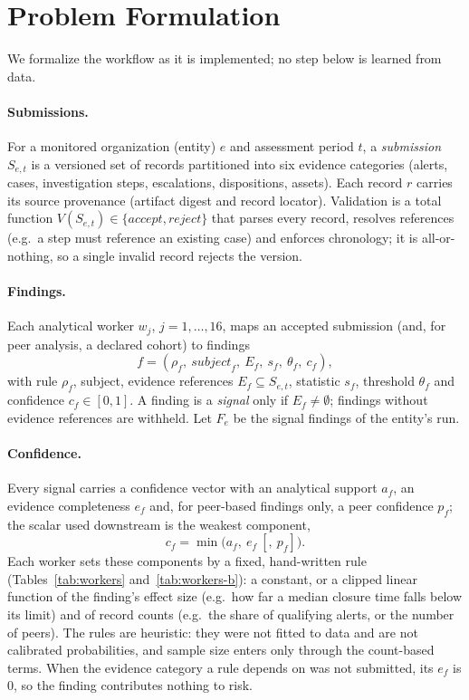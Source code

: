 \section{Problem Formulation}
\label{sec:formulation}

We formalize the workflow as it is implemented; no step below is learned from data.

\paragraph{Submissions.} For a monitored organization (entity) $e$ and assessment
period $t$, a \emph{submission} $S_{e,t}$ is a versioned set of records partitioned
into six evidence categories (alerts, cases, investigation steps, escalations,
dispositions, assets). Each record $r$ carries its source provenance (artifact digest
and record locator). Validation is a total function
$V(S_{e,t})\in\{\mathit{accept},\mathit{reject}\}$ that parses every record, resolves
references (e.g.\ a step must reference an existing case) and enforces chronology; it
is all-or-nothing, so a single invalid record rejects the version.

\paragraph{Findings.} Each analytical worker $w_j$, $j=1,\dots,16$, maps
an accepted submission (and, for peer analysis, a declared cohort) to findings
\begin{equation}
f=(\rho_f,\ \mathit{subject}_f,\ E_f,\ s_f,\ \theta_f,\ c_f),
\end{equation}
with rule $\rho_f$, subject, evidence references $E_f\subseteq S_{e,t}$, statistic $s_f$,
threshold $\theta_f$ and confidence $c_f\in[0,1]$. A finding is a \emph{signal} only if
$E_f\neq\emptyset$; findings without evidence references are withheld. Let $F_e$ be the
signal findings of the entity's run.

\paragraph{Confidence.} Every signal carries a confidence vector with an analytical
support $a_f$, an evidence completeness $e_f$ and, for peer-based findings only, a peer
confidence $p_f$; the scalar used downstream is the weakest component,
\begin{equation}
c_f=\min\bigl(a_f,\ e_f\ [,\ p_f]\bigr).
\label{eq:confidence}
\end{equation}
Each worker sets these components by a fixed, hand-written rule
(Tables~\ref{tab:workers} and~\ref{tab:workers-b}): a constant, or a clipped linear function of the finding's
effect size (e.g.\ how far a median closure time falls below its limit) and of record
counts (e.g.\ the share of qualifying alerts, or the number of peers). The rules are
heuristic: they were not fitted to data and are not calibrated probabilities, and
sample size enters only through the count-based terms. When the evidence category a
rule depends on was not submitted, its $e_f$ is $0$, so the finding contributes nothing
to risk.

